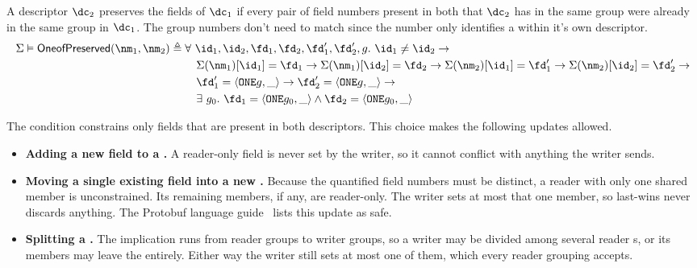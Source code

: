 \vspace{1em}
\begin{definition}\label{def:oneof-pres}
  A descriptor $\dc_2$ preserves the \Oneof{} fields of $\dc_1$ if every pair of
  field numbers present in both that $\dc_2$ has in the same \Oneof{} group were
  already in the same group in $\dc_1$. The group numbers don't need to match
  since the number only identifies a \Oneof{} within it's own descriptor.
  \[ \begin{aligned}
    \Sigma \vDash \oneofpres(\nm_1, \nm_2) \triangleq{}
      & \forall\ \id_1, \id_2, \fd_1, \fd_2, \fd_1', \fd_2', g.\ \id_1 \neq \id_2 \rightarrow \\
      & \quad \Sigma(\nm_1)[\id_1] = \fd_1 \rightarrow \Sigma(\nm_1)[\id_2] = \fd_2 \rightarrow
              \Sigma(\nm_2)[\id_1] = \fd_1' \rightarrow \Sigma(\nm_2)[\id_2] = \fd_2' \rightarrow \\
      & \quad \fd_1' = \field{\oneof{g}}{\_} \rightarrow \fd_2' = \field{\oneof{g}}{\_} \rightarrow \\
      & \quad \exists\ g_0.\ \fd_1 = \field{\oneof{g_0}}{\_} \wedge \fd_2 = \field{\oneof{g_0}}{\_}
  \end{aligned} \]
\end{definition}

The condition constrains only fields that are present in both descriptors.
This choice makes the following updates allowed.

\begin{itemize}
\item \textbf{Adding a new field to a \Oneof{}.} A reader-only field is never
  set by the writer, so it cannot conflict with anything the writer sends.
\item \textbf{Moving a single existing field into a new \Oneof{}.} Because the
  quantified field numbers must be distinct, a reader \Oneof{} with only one
  shared member is unconstrained. Its remaining members, if any, are
  reader-only. The writer sets at most that one member, so last-wins never
  discards anything. The Protobuf language guide~\cite{LanguageGuideProto}
  lists this update as safe.
\item \textbf{Splitting a \Oneof{}.} The implication runs from reader groups to
  writer groups, so a writer \Oneof{} may be divided among several reader
  \Oneof{}s, or its members may leave the \Oneof{} entirely. Either way the
  writer still sets at most one of them, which every reader grouping accepts.
\end{itemize}

